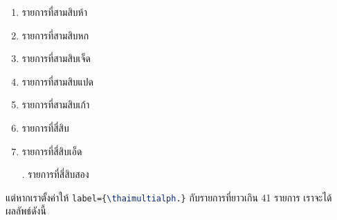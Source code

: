 \documentclass[11pt]{ltxguide}
\begin{document}
\begin{multicols}{4}
\begin{enumerate}[listparindent=0pc,topsep=0pc,itemsep=0pc,label={\thaialph*.}]
        \item  รายการที่สามสิบห้า
        \item  รายการที่สามสิบหก
        \item  รายการที่สามสิบเจ็ด
        \item  รายการที่สามสิบแปด
        \item  รายการที่สามสิบเก้า
        \item  รายการที่สี่สิบ
        \item  รายการที่สี่สิบเอ็ด
        \item[.]  รายการที่สี่สิบสอง
    \end{enumerate}
\end{multicols}

\medskip
แต่หากเราตั้งค่าให้ \lstinline[language=LaTeX]!label={\thaimultialph.}! กับรายการที่ยาวเกิน 41 รายการ เราจะได้ผลลัพธ์ดังนี้
\end{document}
